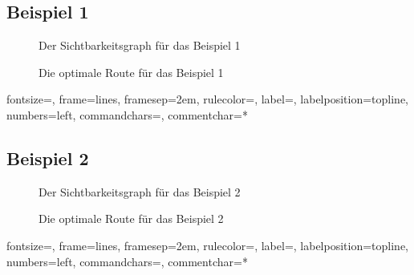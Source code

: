 \documentclass[a4paper, notitlepage, 12pt]{scrartcl}
\begin{document}
\subsection{Beispiel 1}
\begin{minipage}[b]{0.45\linewidth}
	\begin{figure}[H]
		
		\caption{Der Sichtbarkeitsgraph für das Beispiel 1}
	\end{figure}
\end{minipage}
\hspace{0.5cm}
\begin{minipage}[b]{0.45\linewidth}
	\begin{figure}[H] 
		\caption{Die optimale Route für das Beispiel 1}
	\end{figure}
\end{minipage}
{fontsize=\footnotesize,
	frame=lines,  %
	framesep=2em, %
	rulecolor=\color{Gray},
	label=,
	labelposition=topline,
	numbers=left,
	commandchars=\|\(\), %
	commentchar=*        %
}
\subsection{Beispiel 2}
\begin{minipage}[b]{0.45\linewidth}
	\begin{figure}[H]
		
		\caption{Der Sichtbarkeitsgraph für das Beispiel 2}
	\end{figure}
\end{minipage}
\hspace{0.5cm}
\begin{minipage}[b]{0.45\linewidth}
	\begin{figure}[H] 
		\caption{Die optimale Route für das Beispiel 2}
	\end{figure}
\end{minipage}
{fontsize=\footnotesize,
	frame=lines,  %
	framesep=2em, %
	rulecolor=\color{Gray},
	label=,
	labelposition=topline,
	numbers=left,
	commandchars=\|\(\), %
	commentchar=*        %
}
\end{document}
